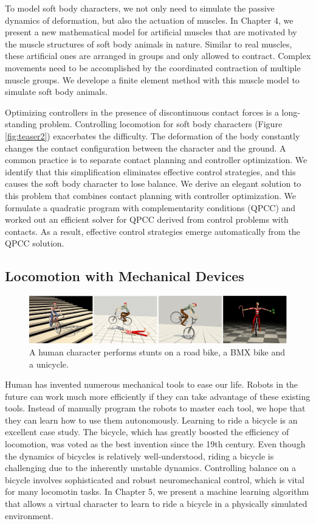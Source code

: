 To model soft body characters, we not only need to simulate the passive dynamics of deformation, but also the actuation of muscles. In Chapter 4, we present a new mathematical model for artificial muscles that are motivated by the muscle structures of soft body animals in nature. Similar to real muscles, these artificial ones are arranged in groups and only allowed to contract. Complex movements need to be accomplished by the coordinated contraction of multiple muscle groups. We develope a finite element method with this muscle model to simulate soft body animals.

Optimizing controllers in the presence of discontinuous contact forces is a long-standing problem. Controlling locomotion for soft body characters (Figure \ref{fig:teaser2}) exacerbates the difficulty. The deformation of the body constantly changes the contact configuration between the character and the ground. A common practice is to separate contact planning and controller optimization. We identify that this simplification eliminates effective control strategies, and this causes the soft body character to lose balance. We derive an elegant solution to this problem that combines contact planning with controller optimization. We formulate a quadratic program with complementarity conditions (QPCC) and worked out an efficient solver for QPCC derived from control problems with contacts. As a result, effective control strategies emerge automatically from the QPCC solution.

\subsection{Locomotion with Mechanical Devices}

\begin{figure}[!h]
  \centering
    \includegraphics[width=\textwidth]{figures/teaserBicycle.eps}
  \caption{A human character performs stunts on a road bike, a BMX bike and a unicycle.}
  \label{fig:teaser3}
\end{figure}

Human has invented numerous mechanical tools to ease our life. Robots in the future can work much more efficiently if they can take advantage of these existing tools. Instead of manually program the robots to master each tool, we hope that they can learn how to use them autonomously. Learning to ride a bicycle is an excellent case study. The bicycle, which has greatly boosted the efficiency of locomotion, was voted as the best invention since the 19th century. Even though the dynamics of bicycles is relatively well-understood, riding a bicycle is challenging due to the inherently unstable dynamics. Controlling balance on a bicycle involves sophisticated and robust neuromechanical control, which is vital for many locomotin tasks. In Chapter 5, we present a machine learning algorithm that allows a virtual character to learn to ride a bicycle in a physically simulated environment. 

